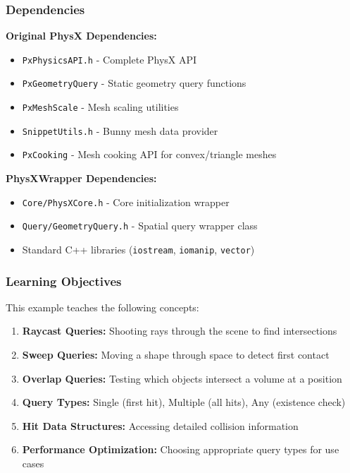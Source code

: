 \subsubsection{Dependencies}

\textbf{Original PhysX Dependencies:}
\begin{itemize}
    \item \texttt{PxPhysicsAPI.h} - Complete PhysX API
    \item \texttt{PxGeometryQuery} - Static geometry query functions
    \item \texttt{PxMeshScale} - Mesh scaling utilities
    \item \texttt{SnippetUtils.h} - Bunny mesh data provider
    \item \texttt{PxCooking} - Mesh cooking API for convex/triangle meshes
\end{itemize}

\textbf{PhysXWrapper Dependencies:}
\begin{itemize}
    \item \texttt{Core/PhysXCore.h} - Core initialization wrapper
    \item \texttt{Query/GeometryQuery.h} - Spatial query wrapper class
    \item Standard C++ libraries (\texttt{iostream}, \texttt{iomanip}, \texttt{vector})
\end{itemize}

\subsubsection{Learning Objectives}

This example teaches the following concepts:
\begin{enumerate}
    \item \textbf{Raycast Queries:} Shooting rays through the scene to find intersections
    \item \textbf{Sweep Queries:} Moving a shape through space to detect first contact
    \item \textbf{Overlap Queries:} Testing which objects intersect a volume at a position
    \item \textbf{Query Types:} Single (first hit), Multiple (all hits), Any (existence check)
    \item \textbf{Hit Data Structures:} Accessing detailed collision information
    \item \textbf{Performance Optimization:} Choosing appropriate query types for use cases
\end{enumerate}

